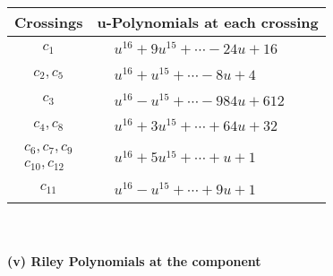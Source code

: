 \documentclass[1p]{elsarticle_modified}
\theoremstyle{definition}
\begin{document}
\begin{tabular}{m{50pt}|m{274pt}}
Crossings & \hspace{64pt}u-Polynomials at each crossing \\
\hline $$\begin{aligned}c_{1}\end{aligned}$$&$\begin{aligned}
&u^{16}+9 u^{15}+\cdots-24 u+16
\end{aligned}$\\
\hline $$\begin{aligned}c_{2},c_{5}\end{aligned}$$&$\begin{aligned}
&u^{16}+u^{15}+\cdots-8 u+4
\end{aligned}$\\
\hline $$\begin{aligned}c_{3}\end{aligned}$$&$\begin{aligned}
&u^{16}- u^{15}+\cdots-984 u+612
\end{aligned}$\\
\hline $$\begin{aligned}c_{4},c_{8}\end{aligned}$$&$\begin{aligned}
&u^{16}+3 u^{15}+\cdots+64 u+32
\end{aligned}$\\
\hline $$\begin{aligned}c_{6},c_{7},c_{9}\\c_{10},c_{12}\end{aligned}$$&$\begin{aligned}
&u^{16}+5 u^{15}+\cdots+u+1
\end{aligned}$\\
\hline $$\begin{aligned}c_{11}\end{aligned}$$&$\begin{aligned}
&u^{16}- u^{15}+\cdots+9 u+1
\end{aligned}$\\
\hline
\end{tabular}\\~\\
\newpage\renewcommand{\arraystretch}{1}
\flushleft \textbf{(v) Riley Polynomials at the component}\newline \\
\end{document}
